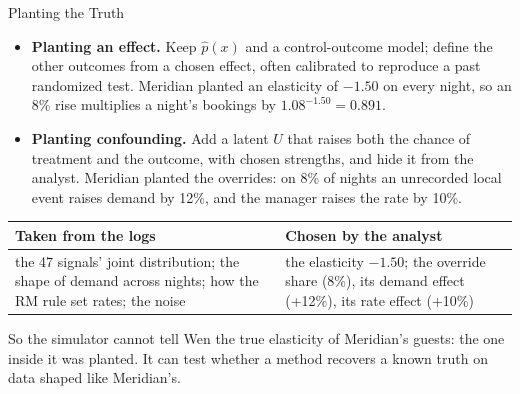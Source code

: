 \documentclass[aspectratio=169, 11pt, handout]{beamer}
\begin{document}
\begin{frame}{Planting the Truth}

\begin{itemize}
  \item \textbf{Planting an effect.} Keep $\hat p(x)$ and a control-outcome model; define the other outcomes from a chosen effect, often calibrated to reproduce a past randomized test. Meridian planted an elasticity of $-1.50$ on every night, so an 8\% rise multiplies a night's bookings by $1.08^{-1.50} = 0.891$.
  \item \textbf{Planting confounding.} Add a latent $U$ that raises both the chance of treatment and the outcome, with chosen strengths, and hide it from the analyst. Meridian planted the overrides: on 8\% of nights an unrecorded local event raises demand by 12\%, and the manager raises the rate by 10\%.
\end{itemize}

\begin{center}
\small
\begin{tabular}{p{6.2cm}p{6.2cm}}
\toprule
\textbf{Taken from the logs} & \textbf{Chosen by the analyst} \\
\midrule
the 47 signals' joint distribution; the shape of demand across nights; how the RM rule set rates; the noise & the elasticity $-1.50$; the override share (8\%), its demand effect (+12\%), its rate effect (+10\%) \\
\bottomrule
\end{tabular}
\end{center}

So the simulator cannot tell Wen the true elasticity of Meridian's guests: the one inside it was planted. It can test whether a method recovers a known truth on data shaped like Meridian's.
\end{frame}
\end{document}
